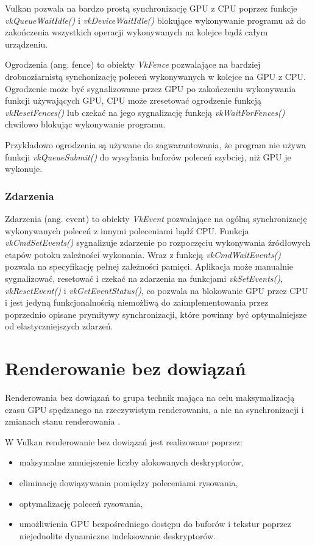 Vulkan pozwala na bardzo prostą synchronizację GPU z CPU poprzez funkcje \textit{vkQueueWaitIdle()} i \textit{vkDeviceWaitIdle()} blokujące wykonywanie programu aż do zakończenia wszystkich operacji wykonywanych na kolejce bądź całym urządzeniu.

Ogrodzenia (ang. fence) to obiekty \textit{VkFence} pozwalające na bardziej drobnoziarnistą synchonizację poleceń wykonywanych w kolejce na GPU z CPU.
Ogrodzenie może być sygnalizowane przez GPU po zakończeniu wykonywania funkcji używających GPU, CPU może zresetować ogrodzenie
funkcją \textit{vkResetFences()} lub czekać na jego sygnalizację funkcją \textit{vkWaitForFences()} chwilowo blokując wykonywanie programu.

Przykładowo ogrodzenia są używane do zagwarantowania, że program nie używa funkcji \textit{vkQueueSubmit()} do wysyłania buforów poleceń szybciej, niż GPU je wykonuje.

\subsubsection{Zdarzenia}
Zdarzenia (ang. event) to obiekty \textit{VkEvent} pozwalające na ogólną synchronizację wykonywanych poleceń z innymi poleceniami bądź CPU.
Funkcja \textit{vkCmdSetEvents()} sygnalizuje zdarzenie po rozpoczęciu wykonywania źródłowych etapów potoku zależności wykonania. Wraz z funkcją \textit{vkCmdWaitEvents()} pozwala na specyfikację pełnej zależności pamięci.
Aplikacja może manualnie sygnalizować, resetować i czekać na zdarzenia na funkcjami \textit{vkSetEvents()}, \textit{vkResetEvent()} i \textit{vkGetEventStatus()}, co pozwala na blokowanie GPU przez CPU i jest jedyną funkcjonalnością niemożliwą do zaimplementowania przez poprzednio opisane prymitywy synchronizacji, które powinny być optymalniejsze od elastyczniejszych zdarzeń.






\section{Renderowanie bez dowiązań}

Renderowania bez dowiązań to grupa technik mająca na celu maksymalizacją czasu GPU spędzanego na rzeczywistym renderowaniu, a nie na synchronizacji i zmianach stanu renderowania \cite{kosarevsky20213d}.

W Vulkan renderowanie bez dowiązań jest realizowane poprzez:
\begin{itemize}
	\item maksymalne zmniejszenie liczby alokowanych deskryptorów,
	\item eliminację dowiązywania pomiędzy poleceniami rysowania,
	\item optymalizację poleceń rysowania,
	\item umożliwienia GPU bezpośredniego dostępu do buforów i tekstur poprzez niejednolite dynamiczne indeksowanie deskryptorów.
\end{itemize}

